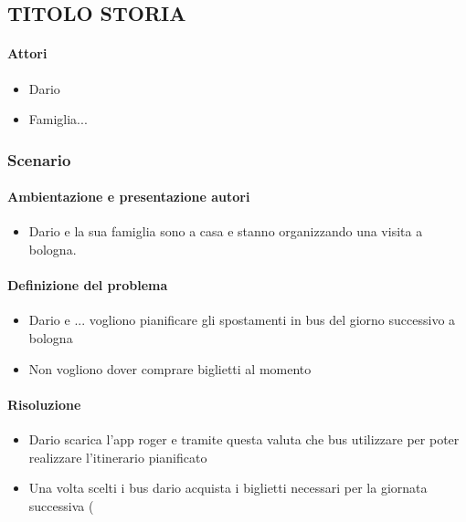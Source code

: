 \documentclass[../../UUX_Personas.tex]{subfiles}
\begin{document}
	\subsection{TITOLO STORIA}
	\paragraph{Attori}
	\begin{itemize}
		\item Dario
		\item Famiglia...
	\end{itemize}

	\subsubsection{Scenario} 
	\paragraph{Ambientazione e presentazione autori}
	\begin{itemize}
		\item Dario e la sua famiglia sono a casa e stanno organizzando una visita a bologna.
	\end{itemize}
	\paragraph{Definizione del problema}
	\begin{itemize}
		\item Dario e ... vogliono pianificare gli spostamenti in bus del giorno successivo a bologna
		\item Non vogliono dover comprare biglietti al momento
	\end{itemize}
	\paragraph{Risoluzione}
	\begin{itemize}
		\item Dario scarica l'app roger e tramite questa valuta che bus utilizzare per poter realizzare l'itinerario pianificato
		\item Una volta scelti i bus dario acquista i biglietti necessari per la giornata successiva (%
	\end{itemize}
\end{document}
